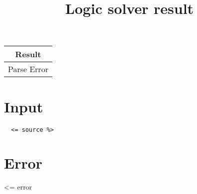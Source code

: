 \documentclass{article}
\title{Logic solver result}
\newcommand{\xmark}{\textcolor{red}{\ding{56}}}%
\begin{document}
\maketitle

\begin{tabular}{|c|}
  \hline
  \cellcolor[gray]{0.8}
  \begin{minipage}{10cm}
    \centering
    Result
  \end{minipage}
  \\\hline

  {
    \huge
    \xmark
    Parse Error
  }
  \\\hline
\end{tabular}

\section*{Input}

\begin{lstlisting}
  <= source %>
\end{lstlisting}

\section*{Error}

<= error %
\end{document}
